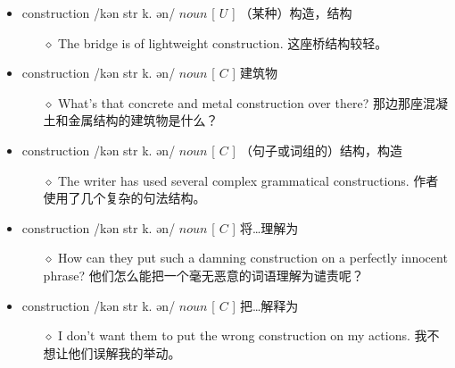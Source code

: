 \documentclass[a4paper,top=2.5cm,buttom=2.5cm10.5pt]{book}
\begin{document}
\begin{itemize}
\item construction /kən \textprimstress str \textturnv k. \textesh ən/ $ noun $ [  $ U $  ] （某种）构造，结构
\begin{itemize}
\item[$\diamond$] The bridge is of lightweight construction.
这座桥结构较轻。
\end{itemize}
\end{itemize}
\begin{itemize}
\item construction /kən \textprimstress str \textturnv k. \textesh ən/ $ noun $ [  $ C $  ] 建筑物
\begin{itemize}
\item[$\diamond$] What's that concrete and metal construction over there?
那边那座混凝土和金属结构的建筑物是什么？
\end{itemize}
\end{itemize}
\begin{itemize}
\item construction /kən \textprimstress str \textturnv k. \textesh ən/ $ noun $ [  $ C $  ] （句子或词组的）结构，构造
\begin{itemize}
\item[$\diamond$] The writer has used several complex grammatical constructions.
作者使用了几个复杂的句法结构。
\end{itemize}
\end{itemize}
\begin{itemize}
\item construction /kən \textprimstress str \textturnv k. \textesh ən/ $ noun $ [  $ C $  ] 将…理解为
\begin{itemize}
\item[$\diamond$] How can they put such a damning construction on a perfectly innocent phrase?
他们怎么能把一个毫无恶意的词语理解为谴责呢？
\end{itemize}
\end{itemize}
\begin{itemize}
\item construction /kən \textprimstress str \textturnv k. \textesh ən/ $ noun $ [  $ C $  ] 把…解释为
\begin{itemize}
\item[$\diamond$] I don't want them to put the wrong construction on my actions.
我不想让他们误解我的举动。
\end{itemize}
\end{itemize}
\end{document}
